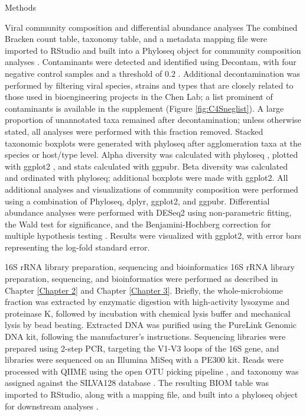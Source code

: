 \documentclass[oneside,12pt,final]{sty/ucthesis-CA2012}
\begin{document}
\begin{mainmatter}
\begin{section}{Methods}
\begin{subsection}{Viral community composition and differential abundance analyses}
The combined Bracken count table, taxonomy table, and a metadata mapping file were imported to RStudio and built into a Phyloseq object for community composition analyses \cite{RN45}. Contaminants were detected and identified using Decontam, with four negative control samples and a threshold of $0.2$ \cite{RN177}. Additional decontamination was performed by filtering viral species, strains and types that are closely related to those used in bioengineering projects in the Chen Lab; a list prominent of contaminants is available in the supplement (Figure \ref{fig:C4Sneglist}). A large proportion of unannotated taxa remained after decontamination; unless otherwise stated, all analyses were performed with this fraction removed. Stacked taxonomic boxplots were generated with phyloseq after agglomeration taxa at the species or host/type level. Alpha diversity was calculated with phyloseq \cite{RN45}, plotted with ggplot2 \cite{RN46}, and stats calculated with ggpubr. Beta diversity was calculated and ordinated with phyloseq; additional boxplots were made with ggplot2. All additional analyses and visualizations of community composition were performed using a combination of Phyloseq, dplyr, ggplot2, and ggpubr. Differential abundance analyses were performed with DESeq2 using non-parametric fitting, the Wald test for significance, and the Benjamini-Hochberg correction for multiple hypothesis testing \cite{RN32}. Results were visualized with ggplot2, with error bars representing the log-fold standard error.
\end{subsection}

\begin{subsection}{16S rRNA library preparation, sequencing and bioinformatics}
16S rRNA library preparation, sequencing, and bioinformatics were performed as described in Chapter \ref{Chapter 2} \cite{RN41} and Chapter \ref{Chapter 3}. Briefly, the whole-microbiome fraction was extracted by enzymatic digestion with high-activity lysozyme and proteinase K, followed by incubation with chemical lysis buffer and mechanical lysis by bead beating. Extracted DNA was purified using the PureLink Genomic DNA kit, following the manufacturer's instructions. Sequencing libraries were prepared using 2-step PCR, targeting the V1-V3 loops of the 16S gene, and libraries were sequenced on an Illumina MiSeq with a PE300 kit. Reads were processed with QIIME using the open OTU picking pipeline \cite{RN81}, and taxonomy was assigned against the SILVA128 database \cite{RN35}. The resulting BIOM table was imported to RStudio, along with a mapping file, and built into a phyloseq object for downstream analyses \cite{RN45}.
\end{subsection}


\end{section}
\end{mainmatter}
\end{document}
